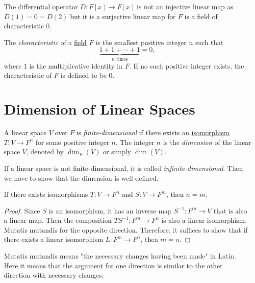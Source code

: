 \begin{example}
  The differential operator $D \colon F[x] \to F[x]$ is not an injective linear map as $D(1) = 0 = D(2)$ but it is a surjective linear map for $F$ is a field of characteristic 0.
\end{example}

\begin{definition}\label{def:characteristic_of_a_field}
  The \emph{characteristic} of a \hyperref[def:field]{field} $F$ is the smallest positive integer $n$ such that
  \[
    \underbrace{1 + 1 + \cdots + 1}_{n \text{ times}} = 0,
  \]
  where $1$ is the multiplicative identity in $F$. If no such positive integer exists, the characteristic of $F$ is defined to be $0$.
\end{definition}

\section{Dimension of Linear Spaces}

\begin{definition}\label{def:finite_dimensional_linear_space}
  A linear space $V$ over $F$ is \emph{finite-dimensional} if there exists an \hyperref[def:linear_isomorphism]{isomorphism} $T \colon V \to F^n$ for some positive integer $n$. The integer $n$ is the \emph{dimension} of the linear space $V$, denoted by $\dim_F(V)$ or simply $\dim(V)$.
\end{definition}

If a linear space is not finite-dimensional, it is called \emph{infinite-dimensional}. Then we have to show that the dimension is well-defined.

\begin{proposition}
  If there exists isomorphisms $T \colon V \to F^n$ and $S \colon V \to F^m$, then $n = m$.
\end{proposition}
\begin{proof}
  Since $S$ is an isomorphism, it has an inverse map $S^{-1} \colon F^m \to V$ that is also a linear map. Then the composition $TS^{-1} \colon F^m \to F^n$ is also a linear isomorphism. Mutatis mutandis for the opposite direction. Therefore, it suffices to show that if there exists a linear isomorphism $L \colon F^m \to F^n$, then $m = n$.
\end{proof}

\begin{remark}
  Mutatis mutandis means "the necessary changes having been made" in Latin. Here it means that the argument for one direction is similar to the other direction with necessary changes.
\end{remark}

